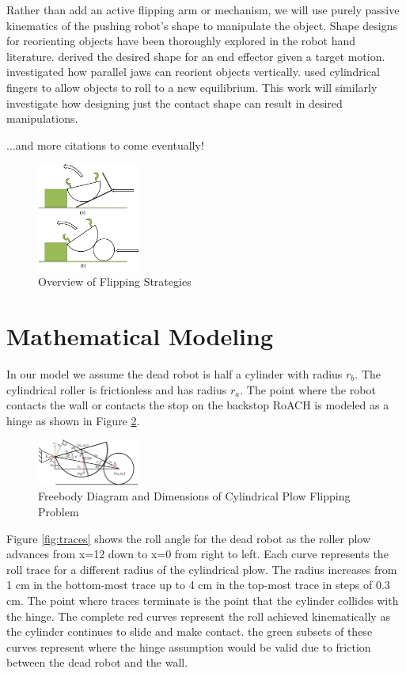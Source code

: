 \documentclass[conference]{IEEEtran}
\begin{document}
Rather than add an active flipping arm or mechanism, we will use purely passive kinematics of the pushing robot's shape to manipulate the object.
Shape designs for reorienting objects have been thoroughly explored in the robot hand literature.
\citet{rodriguez2013effector} derived the desired shape for an end effector given a target motion.
\citet{zhang2002gripper} investigated how parallel jaws can reorient objects vertically.
\citet{fearing1986simplified} used cylindrical fingers to allow objects to roll to a new equilibrium.
This work will similarly investigate how designing just the contact shape can result in desired manipulations.

    ...and more citations to come eventually!

\begin{figure}[h!]
\centering
\includegraphics[width=0.3\textwidth]{Overview_Flipping_Strategies.png}
\caption{\label{fig:Over}Overview of Flipping Strategies}
\end{figure}

\section{Mathematical Modeling}
In our model we assume the dead robot is half a cylinder with radius $r_b$. The cylindrical roller is frictionless and has radius $r_a$. The point where the robot contacts the wall or contacts the stop on the backstop RoACH is modeled as a hinge as shown in Figure \ref{fig:math}.

\begin{figure}[h!]
\centering
\includegraphics[width=0.3\textwidth]{Principles_of_Manipulation.png}
\caption{\label{fig:math}Freebody Diagram and Dimensions of Cylindrical Plow Flipping Problem}
\end{figure}

Figure \ref{fig:traces} shows the roll angle for the dead robot as the roller plow advances from x=12 down to x=0 from right to left. Each curve represents the roll trace for a different radius of the cylindrical plow. The radius increases from 1 cm in the bottom-most trace up to 4 cm in the top-most trace in steps of 0.3 cm. The point where traces terminate is the point that the cylinder collides with the hinge. The complete red curves represent the roll achieved kinematically as the cylinder continues to slide and make contact. the green subsets of these curves represent where the hinge assumption would be valid due to friction between the dead robot and the wall.
\end{document}
